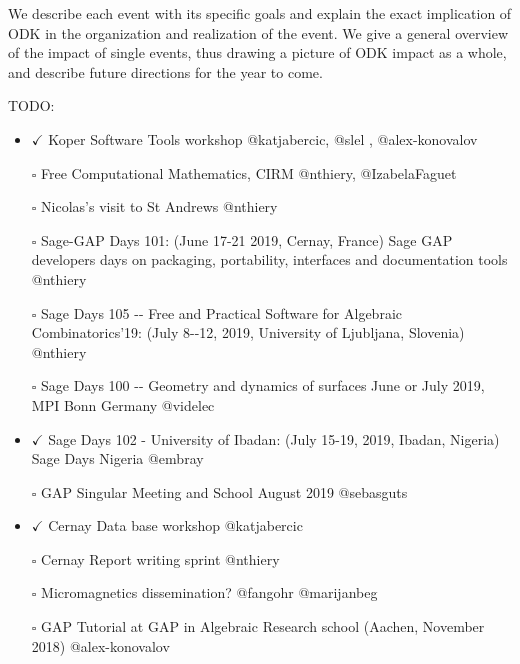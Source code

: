 We describe each event with its specific goals and explain the exact
implication of ODK in the organization and realization of the event. We
give a general overview of the impact of single events, thus drawing a
picture of ODK impact as a whole, and describe future directions for the
year to come.

TODO:

\begin{itemize}
\tightlist
\item
  \(\checkmark\) Koper Software Tools workshop @katjabercic, @slel ,
  @alex-konovalov
\item[$\square$]
  Free Computational Mathematics, CIRM @nthiery, @IzabelaFaguet
\item[$\square$]
  Nicolas's visit to St Andrews @nthiery
\item[$\square$]
  Sage-GAP Days 101: (June 17-21 2019, Cernay, France) Sage GAP
  developers days on packaging, portability, interfaces and
  documentation tools @nthiery
\item[$\square$]
  Sage Days 105 -\/- Free and Practical Software for Algebraic
  Combinatorics'19: (July 8-\/-12, 2019, University of Ljubljana,
  Slovenia) @nthiery
\item[$\square$]
  Sage Days 100 -\/- Geometry and dynamics of surfaces June or July
  2019, MPI Bonn Germany @videlec
\item
  \(\checkmark\) Sage Days 102 - University of Ibadan: (July 15-19,
  2019, Ibadan, Nigeria) Sage Days Nigeria @embray
\item[$\square$]
  GAP Singular Meeting and School August 2019 @sebasguts
\item
  \(\checkmark\) Cernay Data base workshop @katjabercic
\item[$\square$]
  Cernay Report writing sprint @nthiery
\item[$\square$]
  Micromagnetics dissemination? @fangohr @marijanbeg
\item[$\square$]
  GAP Tutorial at GAP in Algebraic Research school (Aachen, November
  2018) @alex-konovalov
\end{itemize}
